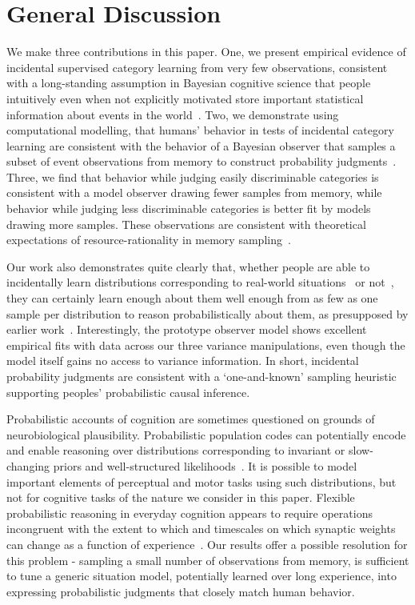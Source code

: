 \documentclass[10pt,letterpaper]{article}
\begin{document}
\section{General Discussion}
We make three contributions in this paper. One, we present empirical evidence of incidental supervised category learning from very few observations, consistent with a long-standing assumption in Bayesian cognitive science that people intuitively even when not explicitly motivated store important statistical information about events in the world~\cite{griffiths2006optimal, stewart2006decision}. Two, we demonstrate using computational modelling, that humans' behavior in tests of incidental category learning are consistent with the behavior of a Bayesian observer that samples a subset of event observations from memory to construct probability judgments~\cite{srivastava2014frugal, zhu2020bayesian}. Three, we find that behavior while judging easily discriminable categories is consistent with a model observer drawing fewer samples from memory, while behavior while judging less discriminable categories is better fit by models drawing more samples. These observations are consistent with theoretical expectations of resource-rationality in memory sampling~\cite{griffiths2015rational, sanborn2016bayesian}.

Our work also demonstrates quite clearly that, whether people are able to incidentally learn distributions corresponding to real-world situations~\cite{hz84} or not~\cite{tvp17}, they can certainly learn enough about them well enough from as few as one sample per distribution to reason probabilistically about them, as presupposed by earlier work~\cite{griffiths2006optimal, stewart2006decision}. Interestingly, the prototype observer model shows excellent empirical fits with data across our three variance manipulations, even though the model itself gains no access to variance information. In short, incidental probability judgments are consistent with a `one-and-known' sampling heuristic supporting peoples' probabilistic causal inference. 

Probabilistic accounts of cognition are sometimes questioned on grounds of neurobiological plausibility. Probabilistic population codes can potentially encode and enable reasoning over distributions corresponding to invariant or slow-changing priors and well-structured likelihoods~\cite{ma2006bayesian}. It is possible to model important elements of perceptual and motor tasks using such distributions, but not for cognitive tasks of the nature we consider in this paper. Flexible probabilistic reasoning in everyday cognition appears to require operations incongruent with the extent to which and timescales on which synaptic weights can change as a function of experience~\cite{malinow1988persistent}. Our results  offer a possible resolution for this problem - sampling a small number of observations from memory, is sufficient to tune a generic situation model, potentially learned over long experience, into expressing probabilistic judgments that closely match human behavior. 
\end{document}
